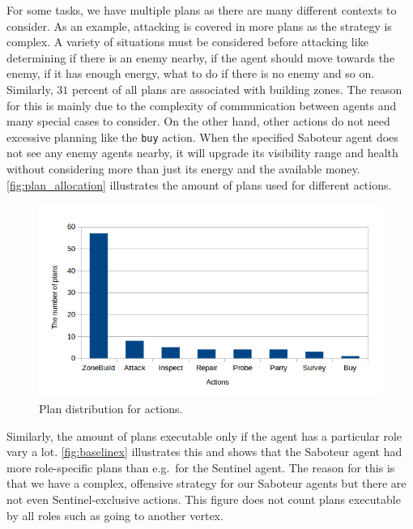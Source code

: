 For some tasks, we have multiple plans as there are many different contexts to consider.
As an example, attacking is covered in more plans as the strategy is complex.
A variety of situations must be considered before attacking like determining if there is an enemy nearby, if the agent should move towards the enemy, if it has enough energy, what to do if there is no enemy and so on.
Similarly, $31$ percent of all plans are associated with building zones.
The reason for this is mainly due to the complexity of communication between agents and many special cases to consider.
On the other hand, other actions do not need excessive planning like the \texttt{buy} action.
When the specified Saboteur agent does not see any enemy agents nearby, it will upgrade its visibility range and health without considering more than just its energy and the available money.
\autoref{fig:plan_allocation} illustrates the amount of plans used for different actions.
\begin{figure}
  \centering
  \includegraphics[width=\textwidth]{images/BDI_plan_distribution_action}
  \caption{Plan distribution for actions.}
  \label{fig:plan_allocation}
\end{figure}
Similarly, the amount of plans executable only if the agent has a particular role vary a lot.
\autoref{fig:baselinex} illustrates this and shows that the Saboteur agent had more role-specific plans than e.g.\ for the Sentinel agent.
The reason for this is that we have a complex, offensive strategy for our Saboteur agents but there are not even Sentinel-exclusive actions.
This figure does not count plans executable by all roles such as going to another vertex.
